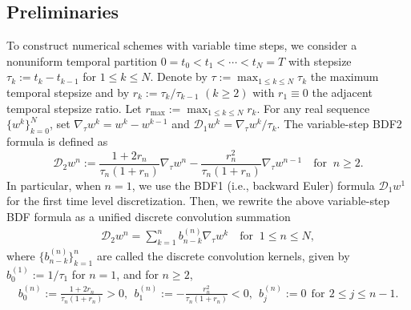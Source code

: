 \documentclass{m2an}
\newcommand{\md}{\mathcal{D}}
\begin{document}
\subsection{Preliminaries}
To construct numerical schemes with variable time steps, we consider a nonuniform temporal partition $ 0 = t_{0} < t_{1} < \cdots < t_{N} = T$ with stepsize $ \tau_{k} := t_{k} - t_{k-1} $ for $ 1 \leq k \leq N $. Denote by $ \tau := \max_{1 \leq k \leq N} \tau_{k}$ the maximum temporal stepsize and by $ r_{k} := \tau_{k}/\tau_{k-1}$ $ (k \geq 2) $ with $ r_{1} \equiv 0 $ the adjacent temporal stepsize ratio. Let $r_{\max }:=\max_{1 \leq k \leq N}r_{k}$. For any real sequence $ \{ w^{k} \}^{N}_{k=0} $, set $ \nabla_{\tau} w^{k} = w^{k} - w^{k-1}$ and $ \md_{1} w^{k} = \nabla_{\tau} w^{k}/\tau_{k} $. The variable-step BDF2 formula is defined as
$$
\md_{2} w^{n} := \frac{ 1 + 2 r_{n} }{\tau_{n} (1 + r_{n}) } \nabla_{\tau} w^{n} - \frac{ r_{n}^{2} }{\tau_{n} (1 + r_{n}) } \nabla_{\tau} w^{n-1}\quad \text{for } \   n \ge 2.
$$
In particular, when $n=1$,  we use the BDF1 (i.e., backward Euler) formula $ \md_{1} w^{1}$ for the first time level discretization.
Then, we rewrite the above variable-step BDF formula as a unified discrete convolution summation
\begin{equation}\label{Formula:BDF2}
	\begin{aligned}
		\md_{2} w^{n} = \sum^{n}_{k=1} b^{(n)}_{n-k} \nabla_{\tau} w^{k}\quad \text{for } \  1 \le n \le N,
	\end{aligned}
\end{equation}
where $\{  b^{(n)}_{n-k} \}_{k=1}^{n}$ are called the discrete convolution kernels, given by $ b^{(1)}_{0} := 1/\tau_{1}$ for $n =1$, and for $n \ge 2$,
\begin{equation}\label{Def:DCK}
	\begin{aligned}
		b^{(n)}_{0} := \frac{ 1 + 2 r_{n} }{\tau_{n} (1 + r_{n}) } > 0, ~~ b^{(n)}_{1} := - \frac{ r_{n}^{2} }{\tau_{n} (1 + r_{n}) } < 0, ~~  b^{(n)}_{j} := 0 \   \   \text{for} \,\  2 \leq j \leq n-1.
	\end{aligned}
\end{equation}
\end{document}
